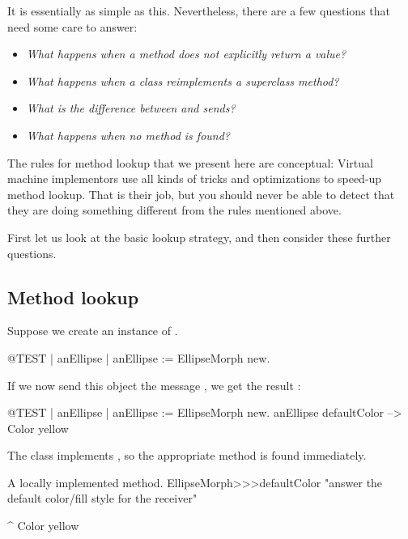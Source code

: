 \documentclass[a4paper,10pt,twoside]{book}
\begin{document}
It is essentially as simple as this.
Nevertheless, there are a few questions that need some care to answer:

\begin{itemize}
  \item \emph{What happens when a method does not explicitly return a value?}
  \item \emph{What happens when a class reimplements a superclass method?}
  \item \emph{What is the difference between  and  sends?}
  \item \emph{What happens when no method is found?}
\end{itemize}

The rules for method lookup that we present here are conceptual:
Virtual machine implementors use all kinds of tricks and optimizations to speed-up method lookup.
That is their job, but you should never be able to detect that they are doing something different from the rules mentioned above.

First let us look at the basic lookup strategy, and then consider these further questions.

\subsection{Method lookup}
Suppose we create an instance of .
\begin{code}{@TEST | anEllipse |}
anEllipse := EllipseMorph new.
\end{code}
\noindent
If we now send this object the message , we get the result :
\begin{code}{@TEST | anEllipse | anEllipse := EllipseMorph new.}
anEllipse defaultColor --> Color yellow
\end{code}
\noindent
The class  implements , so the appropriate method is found immediately.

\begin{method}[defaultColor]{A locally implemented method.}
EllipseMorph>>>defaultColor
	"answer the default color/fill style for the receiver"

	^ Color yellow
\end{method}
\end{document}
